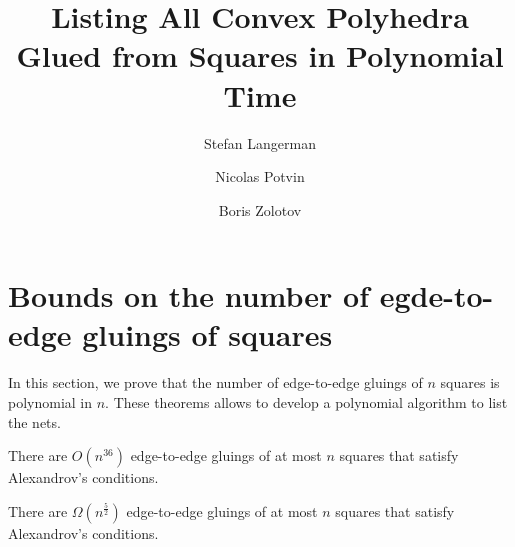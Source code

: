 \documentclass[a4paper,USenglish,cleveref, autoref, thm-restate]{socg-lipics-v2019}
\title{Listing All Convex Polyhedra Glued from Squares in Polynomial Time}
\author{Stefan Langerman}{Faculté des Sciences, Université Libre de Bruxelles}{stefan.langerman@ulb.ac.be}{ }{Whatever grant}
\author{Nicolas Potvin}{Faculté des Sciences, Université Libre de Bruxelles}{potvinnicolas2@gmail.com}{ }{Whatever grant}
\author{Boris Zolotov}{Department of Mathematics and Computer Sciences, St. Petersburg State University}{boris.a.zolotov@yandex.com}{ }{Whatever grant}
\begin{document}
\maketitle

\section{Bounds on the number of egde-to-edge gluings of squares}

In this section, we prove that the number of edge-to-edge gluings of $n$ squares is polynomial in $n$. These theorems allows to develop a polynomial algorithm to list the nets.

\begin{theorem} \label{thm:n36}
	There are $O \left( n^{36} \right)$ edge-to-edge gluings of at most $n$ squares that satisfy Alexandrov's conditions.
\end{theorem}

\begin{theorem} \label{thm:n52}
	There are $\Omega \left( n^{\frac52} \right)$ edge-to-edge gluings of at most $n$ squares that satisfy Alexandrov's conditions.
\end{theorem}

% 
\end{document}

